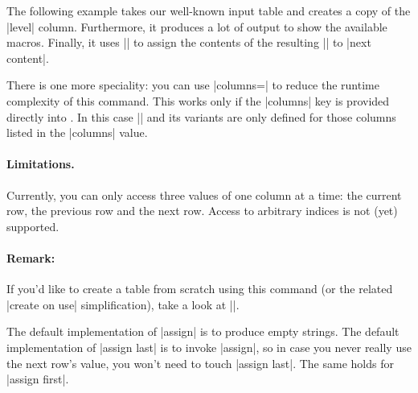 \begin{command}{\pgfplotstablecreatecol{}}
The following example takes our well-known input table and creates a copy of the |level| column. Furthermore, it produces a lot of output to show the available macros. Finally, it uses |\pgfkeyslet| to assign the contents of the resulting |\entry| to |next content|.
\begin{codeexample}[]
\loadedtable
{}\loadedtable

\pgfplotstabletypeset[
	column type=l,
	columns={level,new},
	columns/new/.style={string type}
]\loadedtable
\end{codeexample}

There is one more speciality: you can use |columns=| to reduce the runtime complexity of this command. This works only if the |columns| key is provided directly into . In this case |\thisrow| and its variants are only defined for those columns listed in the |columns| value.

\paragraph{Limitations.} Currently, you can only access three values of one column at a time: the current row, the previous row and the next row. Access to arbitrary indices is not (yet) supported.

\paragraph{Remark:} If you'd like to create a table from scratch using this command (or the related |create on use| simplification), take a look at |\pgfplotstablenew|.

The default implementation of |assign| is to produce empty strings. The default implementation of |assign last| is to invoke |assign|, so in case you never really use the next row's value, you won't need to touch |assign last|. The same holds for |assign first|.
\end{command}

